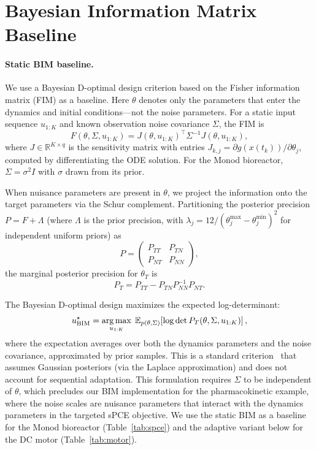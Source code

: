 \section{Bayesian Information Matrix Baseline}
\label{sec:bim}

\paragraph{Static BIM baseline.}
We use a Bayesian D-optimal design criterion based on the Fisher information matrix (FIM) as a baseline. Here $\theta$ denotes only the parameters that enter the dynamics and initial conditions---not the noise parameters. For a static input sequence $u_{1:K}$ and known observation noise covariance $\Sigma$, the FIM is
\begin{equation}
F(\theta, \Sigma, u_{1:K}) = J(\theta, u_{1:K})^\top \Sigma^{-1} J(\theta, u_{1:K}),
\end{equation}
where $J \in \mathbb{R}^{K \times q}$ is the sensitivity matrix with entries $J_{k,j} = \partial g(x(t_k)) / \partial \theta_j$, computed by differentiating the ODE solution. For the Monod bioreactor, $\Sigma = \sigma^2 I$ with $\sigma$ drawn from its prior.

When nuisance parameters are present in $\theta$, we project the information onto the target parameters via the Schur complement. Partitioning the posterior precision $P = F + \Lambda$ (where $\Lambda$ is the prior precision, with $\lambda_j = 12/(\theta_j^{\max} - \theta_j^{\min})^2$ for independent uniform priors) as
\begin{equation}
P = \begin{pmatrix} P_{TT} & P_{TN} \\ P_{NT} & P_{NN} \end{pmatrix},
\end{equation}
the marginal posterior precision for $\theta_T$ is
\begin{equation}
P_T = P_{TT} - P_{TN} P_{NN}^{-1} P_{NT}.
\end{equation}

The Bayesian D-optimal design maximizes the expected log-determinant:
\begin{equation}
u^\star_{\text{BIM}} = \operatorname*{arg\,max}_{u_{1:K}} \; \operatorname{\mathbb{E}}_{p(\theta, \Sigma)}\!\left[\log\det P_T(\theta, \Sigma, u_{1:K})\right],
\end{equation}
where the expectation averages over both the dynamics parameters and the noise covariance, approximated by prior samples. This is a standard criterion~\cite{chaloner1995} that assumes Gaussian posteriors (via the Laplace approximation) and does not account for sequential adaptation.
This formulation requires $\Sigma$ to be independent of $\theta$, which precludes our BIM implementation for the pharmacokinetic example, where the noise scales are nuisance parameters that interact with the dynamics parameters in the targeted sPCE objective.
We use the static BIM as a baseline for the Monod bioreactor (Table~\ref{tab:spce}) and the adaptive variant below for the DC motor (Table~\ref{tab:motor}).

